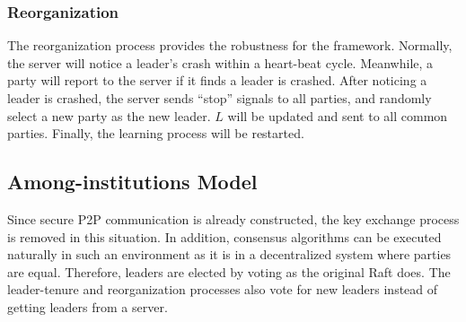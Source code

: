 \subsubsection{\textbf{Reorganization}}
The reorganization process provides the robustness for the framework. Normally, the server will notice a leader's crash within a heart-beat cycle. Meanwhile, a party will report to the server if it finds a leader is crashed. After noticing a leader is crashed, the server sends ``stop'' signals to all parties, and randomly select a new party as the new leader. $L$ will be updated and sent to all common parties. Finally, the learning process will be restarted.

\subsection{Among-institutions Model}
Since secure P2P communication is already constructed, the key exchange process is removed in this situation. In addition, consensus algorithms can be executed naturally in such an environment as it is in a decentralized system where parties are equal. Therefore, leaders are elected by voting as the original Raft does. The leader-tenure and reorganization processes also vote for new leaders instead of getting leaders from a server.


